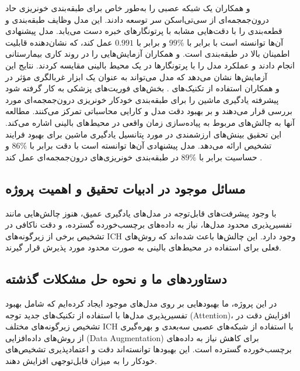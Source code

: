  و همکاران یک شبکه عصبی 
  را به‌طور خاص برای طبقه‌بندی خونریزی حاد درون‌جمجمه‌ای از سی‌تی‌اسکن سر توسعه دادند. این مدل وظایف طبقه‌بندی و قطعه‌بندی را با دقت‌هایی مشابه با پرتونگار‌های خبره دست می‌یابد. مدل پیشنهادی آن‌ها توانسته است با  
  برابر با 
 \(99\%\)
 و
 برابر با 
 \(0.991\)
 عمل کند، که نشان‌دهنده قابلیت اطمینان بالا در طبقه‌بندی است. 
  و همکاران آزمایش‌هایی را در روند کاری بیمارستانی انجام دادند و عملکرد مدل را با پرتونگار‌ها در یک محیط بالینی مقایسه کردند. نتایج این آزمایش‌ها نشان می‌دهد که مدل می‌تواند به عنوان یک ابزار غربالگری مؤثر در بخش‌های فوریت‌های پزشکی به کار گرفته شود‎\cite{kuo2019expert}
.
و همکاران استفاده از تکنیک‌های پیشرفته یادگیری ماشین را برای طبقه‌بندی خودکار خونریزی درون‌جمجمه‌ای مورد بررسی قرار می‌دهند و بر بهبود دقت مدل و کارایی محاسباتی تمرکز می‌کنند. مطالعه آنها به چالش‌های مربوط به پیاده‌سازی زمان واقعی
 در محیط‌های بالینی اشاره می‌کند. این تحقیق بینش‌های ارزشمندی در مورد پتانسیل یادگیری ماشین برای بهبود فرایند تشخیص ارائه می‌دهد. مدل پیشنهادی آن‌ها توانسته است با دقت 
  برابر با 
 \(86\%\)
 و حساسیت 
  برابر با 
 \(89\%\)
 در طبقه‌بندی خونریزی‌های درون‌جمجمه‌ای عمل کند
\cite{arbabshirani2018advanced}.



\subsection*{مسائل موجود در ادبیات تحقیق و اهمیت پروژه}




با وجود پیشرفت‌های قابل‌توجه در مدل‌های یادگیری عمیق، هنوز چالش‌هایی مانند تفسیرپذیری محدود مدل‌ها، نیاز به داده‌های برچسب‌خورده گسترده، و دقت ناکافی در تشخیص برخی از زیرگونه‌های ICH وجود دارد. این چالش‌ها باعث شده‌اند که روش‌های فعلی برای استفاده در محیط‌های بالینی به صورت محدود مورد پذیرش قرار گیرند.

\subsection*{دستاوردهای ما و نحوه حل مشکلات گذشته}

در این پروژه، ما بهبودهایی بر روی مدل‌های موجود ایجاد کرده‌ایم که شامل بهبود تفسیرپذیری مدل‌ها با استفاده از تکنیک‌های جدید توجه (Attention)، افزایش دقت در تشخیص زیرگونه‌های مختلف ICH با استفاده از شبکه‌های عصبی سه‌بعدی و بهره‌گیری از روش‌های داده‌افزایی (Data Augmentation) برای کاهش نیاز به داده‌های برچسب‌خورده گسترده است. این بهبودها توانسته‌اند دقت و اعتمادپذیری تشخیص‌های خودکار را به میزان قابل‌توجهی افزایش دهند.
